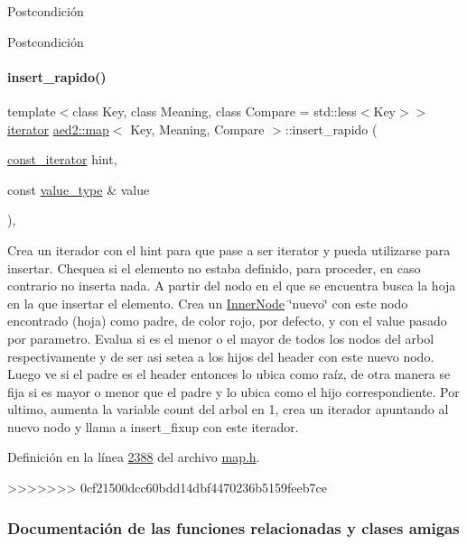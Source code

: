 \begin{DoxyPostcond}{\-Postcondición}
\begin{DoxyPostcond}{\-Postcondición}
\paragraph{\texorpdfstring{insert\+\_\+rapido()}{insert\_rapido()}}
{\footnotesize\ttfamily template$<$class Key, class Meaning, class Compare = std\+::less$<$\+Key$>$$>$ \\
\hyperlink{classaed2_1_1map_1_1iterator}{iterator} \hyperlink{classaed2_1_1map}{aed2\+::map}$<$ Key, Meaning, Compare $>$\+::insert\+\_\+rapido (\begin{DoxyParamCaption}\item[{\hyperlink{classaed2_1_1map_1_1const__iterator}{const\+\_\+iterator}}]{hint,  }\item[{const \hyperlink{classaed2_1_1map_a719db98e0ff9a837610f76be33264680_a719db98e0ff9a837610f76be33264680}{value\+\_\+type} \&}]{value }\end{DoxyParamCaption})\hspace{0.3cm}{\ttfamily [inline]}, {\ttfamily [private]}}

Crea un iterador con el hint para que pase a ser iterator y pueda utilizarse para insertar. Chequea si el elemento no estaba definido, para proceder, en caso contrario no inserta nada. A partir del nodo en el que se encuentra busca la hoja en la que insertar el elemento. Crea un \hyperlink{structaed2_1_1map_1_1InnerNode}{Inner\+Node} \char`\"{}nuevo\char`\"{} con este nodo encontrado (hoja) como padre, de color rojo, por defecto, y con el value pasado por parametro. Evalua si es el menor o el mayor de todos los nodos del arbol respectivamente y de ser asi setea a los hijos del header con este nuevo nodo. Luego ve si el padre es el header entonces lo ubica como raíz, de otra manera se fija si es mayor o menor que el padre y lo ubica como el hijo correspondiente. Por ultimo, aumenta la variable count del arbol en 1, crea un iterador apuntando al nuevo nodo y llama a insert\+\_\+fixup con este iterador. 

Definición en la línea \hyperlink{map_8h_source_l02388}{2388} del archivo \hyperlink{map_8h_source}{map.\+h}.

>>>>>>> 0cf21500dcc60bdd14dbf4470236b5159feeb7ce


\subsubsection{Documentación de las funciones relacionadas y clases amigas}
\mbox{\label{classaed2_1_1map_abfc51b39670220e79037ac067006e933_abfc51b39670220e79037ac067006e933}} 

\end{DoxyPostcond}
\end{DoxyPostcond}
